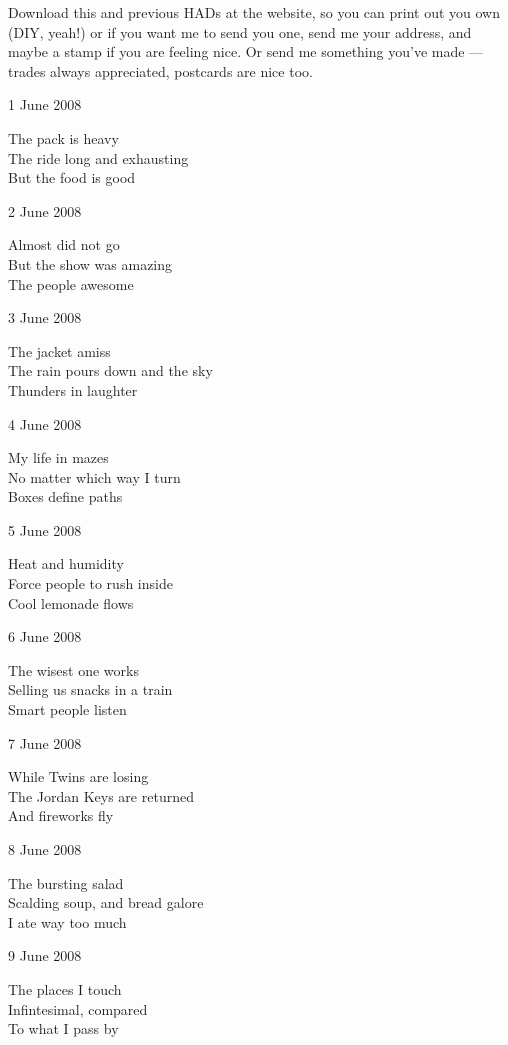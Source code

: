 \documentclass[12pt]{article}
\begin{document}
Download this and previous HADs at the website, so you can
print out you own (DIY, yeah!) or if you want me to send
you one, send me your address, and maybe a stamp if you
are feeling nice. Or send me something you've made ---
trades always appreciated, postcards are nice too.

1 June 2008

The pack is heavy \\
The ride long and exhausting \\
But the food is good

2 June 2008

Almost did not go \\
But the show was amazing \\
The people awesome

\newpage

3 June 2008

The jacket amiss \\
The rain pours down and the sky \\
Thunders in laughter

4 June 2008

My life in mazes \\
No matter which way I turn \\
Boxes define paths

5 June 2008

Heat and humidity \\
Force people to rush inside \\
Cool lemonade flows

6 June 2008

The wisest one works \\
Selling us snacks in a train \\
Smart people listen

7 June 2008

While Twins are losing \\
The Jordan Keys are returned \\
And fireworks fly

8 June 2008

The bursting salad \\
Scalding soup, and bread galore \\
I ate way too much

9 June 2008 

The places I touch \\
Infintesimal, compared \\
To what I pass by


\newpage
\end{document}

